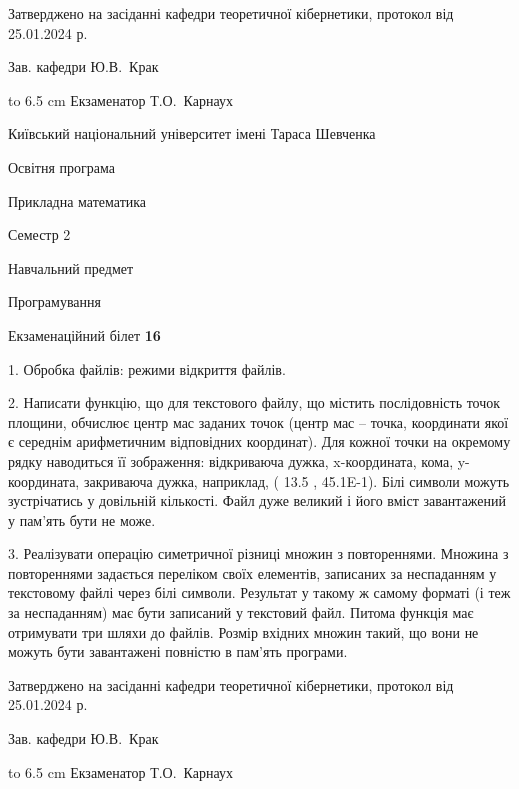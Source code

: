 \documentclass[12pt, ukrainian]{article}
\begin{document}
{\smallskip\smallskip \begin {scriptsize} Затверджено на засіданні кафедри теоретичної кібернетики, протокол   від   25.01.2024 р.\par\smallskip\smallskip\smallskip\smallskip
{\parbox {6.5 cm} {Зав. кафедри \dotfill Ю.В.~Крак}}\hspace {0.7cm} {\hbox to 6.5 cm { Екзаменатор \dotfill Т.О.~Карнаух}} \end{scriptsize}}
\newpage
{{\begin {scriptsize}\par
{ \center  Київський національний університет імені Тараса Шевченка \par}
{\parbox {5 cm}{Освітня програма \hfill}{\parbox {7 cm}{Прикладна математика\hfill}}\parbox {6 cm}{\hfill Семестр 2}}\par
{\parbox {5 cm} {Навчальний предмет \hfill}\parbox {7 cm}{Програмування \hfill}\parbox {6cm}{\hfill}\par}\vspace{-15pt} \end{scriptsize}}{\center Екзаменаційний білет \No \textbf { 16 }\par}}
{%
1. Обробка файлів: режими відкриття файлів.%
\par
2. Написати функцію, що для текстового файлу, що містить послідовність точок площини, обчислює центр мас заданих точок (центр мас -- точка, координати якої є середнім арифметичним відповідних координат). Для кожної точки на окремому рядку наводиться її зображення: відкриваюча дужка, x-координата, кома, y-координата, закриваюча дужка, наприклад, ( 13.5 , 45.1E-1). Білі символи можуть зустрічатись у довільній кількості. Файл дуже великий і його вміст завантажений у пам'ять бути не може.

\par
3. Реалізувати операцію симетричної різниці множин з повтореннями. Множина з повтореннями задається переліком своїх елементів, записаних за неспаданням у текстовому файлі через білі символи. Результат у такому ж самому форматі (і теж за неспаданням) має бути записаний у текстовий файл. Питома функція має отримувати три шляхи до файлів. Розмір вхідних множин такий, що вони не можуть бути завантажені повністю в пам’ять програми.

}
{\smallskip\smallskip \begin {scriptsize} Затверджено на засіданні кафедри теоретичної кібернетики, протокол   від   25.01.2024 р.\par\smallskip\smallskip\smallskip\smallskip
{\parbox {6.5 cm} {Зав. кафедри \dotfill Ю.В.~Крак}}\hspace {0.7cm} {\hbox to 6.5 cm { Екзаменатор \dotfill Т.О.~Карнаух}} \end{scriptsize}}
\end{document}
